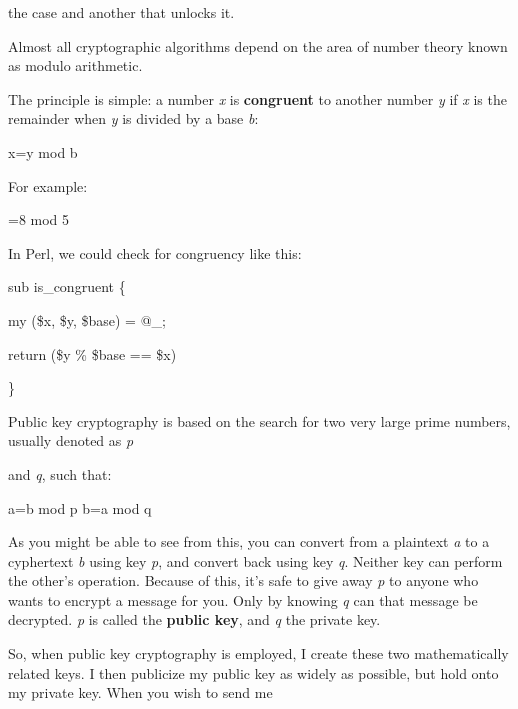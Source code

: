 \documentclass[a4paper,11pt]{book}
\begin{document}
\noindent the case and another that unlocks it.

\noindent 

\noindent 

\noindent Almost all cryptographic algorithms depend on the area of number theory known as modulo arithmetic.

\noindent The principle is simple: a number \textit{x }is \textbf{congruent }to another number \textit{y }if \textit{x }is the remainder when \textit{y }is divided by a base \textit{b}:

\noindent 

\noindent x=y mod b

\noindent 

\noindent For example:

\noindent 

\noindent 

=8 mod 5

\noindent 

\noindent In Perl, we could check for congruency like this:

\noindent 

\noindent sub is\_congruent \{

\noindent my (\$x, \$y, \$base) = @\_;

\noindent return (\$y \% \$base == \$x)

\noindent \}

\noindent 

\noindent Public key cryptography is based on the search for two very large prime numbers, usually denoted as \textit{p}

\noindent and \textit{q}, such that:

\noindent 

\noindent 

\noindent a=b mod p b=a mod q

\noindent 

\noindent As you might be able to see from this, you can convert from a plaintext \textit{a }to a cyphertext \textit{b }using key \textit{p}, and convert back using key \textit{q}. Neither key can perform the other's operation. Because of this, it's safe to give away \textit{p }to anyone who wants to encrypt a message for you. Only by knowing \textit{q }can that message be decrypted. \textit{p }is called the \textbf{public key}, and \textit{q }the private key.

\noindent 

\noindent So, when public key cryptography is employed, I create these two mathematically related keys. I then publicize my public key as widely as possible, but hold onto my private key. When you wish to send me
\end{document}
